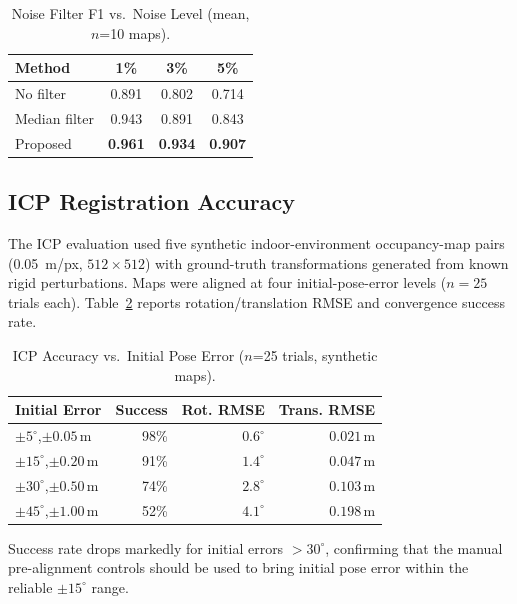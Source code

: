 \documentclass{IEEE_lsens}
\begin{document}
\begin{table}[t]
\centering
\caption{Noise Filter F1 vs.\ Noise Level (mean, $n$=10 maps).}
\label{tab:noiseval}
\scriptsize
\renewcommand{\arraystretch}{1.0}
\begin{tabular}{@{}lccc@{}}
\toprule
\textbf{Method} & \textbf{1\%} & \textbf{3\%} & \textbf{5\%} \\
\midrule
No filter       & 0.891 & 0.802 & 0.714 \\
Median filter   & 0.943 & 0.891 & 0.843 \\
Proposed        & \textbf{0.961} & \textbf{0.934} & \textbf{0.907} \\
\bottomrule
\end{tabular}
\vspace{-2mm}
\end{table}

\subsection{ICP Registration Accuracy}
The ICP evaluation used five synthetic indoor-environment occupancy-map pairs (0.05~m/px, $512\times512$) with ground-truth transformations generated from known rigid perturbations. Maps were aligned at four initial-pose-error levels ($n=25$ trials each). Table~\ref{tab:icpval} reports rotation/translation RMSE and convergence success rate.

\begin{table}[t]
\centering
\caption{ICP Accuracy vs.\ Initial Pose Error ($n$=25 trials, synthetic maps).}
\label{tab:icpval}
\scriptsize
\renewcommand{\arraystretch}{1.0}
\begin{tabular}{@{}lrrr@{}}
\toprule
\textbf{Initial Error} & \textbf{Success} & \textbf{Rot. RMSE} & \textbf{Trans. RMSE} \\
\midrule
$\pm5^\circ$,\;$\pm0.05$\,m & 98\% & $0.6^\circ$ & $0.021$\,m \\
$\pm15^\circ$,\;$\pm0.20$\,m & 91\% & $1.4^\circ$ & $0.047$\,m \\
$\pm30^\circ$,\;$\pm0.50$\,m & 74\% & $2.8^\circ$ & $0.103$\,m \\
$\pm45^\circ$,\;$\pm1.00$\,m & 52\% & $4.1^\circ$ & $0.198$\,m \\
\bottomrule
\end{tabular}
\vspace{-2mm}
\end{table}

Success rate drops markedly for initial errors $>30^\circ$, confirming that the manual pre-alignment controls should be used to bring initial pose error within the reliable $\pm15^\circ$ range.
\end{document}
